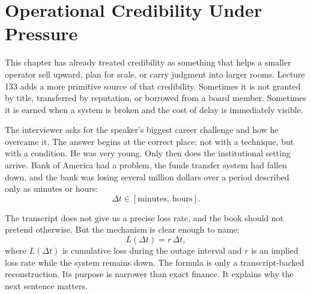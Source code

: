 \documentclass[11pt,oneside]{book}
\begin{document}

\section{Operational Credibility Under Pressure}

This chapter has already treated credibility as something that helps a smaller operator sell upward, plan for scale, or carry judgment into larger rooms. Lecture 133 adds a more primitive source of that credibility. Sometimes it is not granted by title, transferred by reputation, or borrowed from a board member. Sometimes it is earned when a system is broken and the cost of delay is immediately visible.

The interviewer asks for the speaker's biggest career challenge and how he overcame it. The answer begins at the correct place: not with a technique, but with a condition. He was very young. Only then does the institutional setting arrive. Bank of America had a problem, the funds transfer system had fallen down, and the bank was losing several million dollars over a period described only as minutes or hours:
\[
\Delta t \in [\text{minutes},\ \text{hours}].
\]

The transcript does not give us a precise loss rate, and the book should not pretend otherwise. But the mechanism is clear enough to name:
\[
L(\Delta t)=r\,\Delta t,
\]
where \(L(\Delta t)\) is cumulative loss during the outage interval and \(r\) is an implied loss rate while the system remains down. The formula is only a transcript-backed reconstruction. Its purpose is narrower than exact finance. It explains why the next sentence matters.
\end{document}
